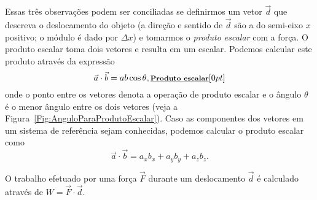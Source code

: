 \noindent{}Essas três observações podem ser conciliadas se definirmos um vetor $\vec{d}$ que descreva o deslocamento do objeto (a direção e sentido de $\vec{d}$ são a do semi-eixo $x$ positivo; o módulo é dado por $\Delta x$) e tomarmos o \emph{produto escalar} com a força. O produto escalar toma dois vetores e resulta em um escalar. Podemos calcular este produto através da expressão
\begin{equation}
    \vec{a} \cdot \vec{b} = ab\cos\theta, \relax{\footnotesize\emph{\textbf{Produto escalar}}}[0pt]
\end{equation}
%
onde o ponto entre os vetores denota a operação de produto escalar e o ângulo $\theta$ é o menor ângulo entre os dois vetores (veja a Figura~\ref{Fig:AnguloParaProdutoEscalar}). Caso as componentes dos vetores em um sistema de referência sejam conhecidas, podemos calcular o produto escalar como
\begin{equation}
    \vec{a} \cdot \vec{b} = a_xb_x + a_yb_y + a_zb_z.
\end{equation}

\begin{marginfigure}[-15mm]
\centering
{}
\caption{O trabalho efetuado por uma força $\vec{F}$ durante um deslocamento $\vec{d}$ é calculado através de $W = \vec{F}\cdot\vec{d}$.\label{Fig:DefDeslocamentoDeterminacaoTrabalho}}
\end{marginfigure}

